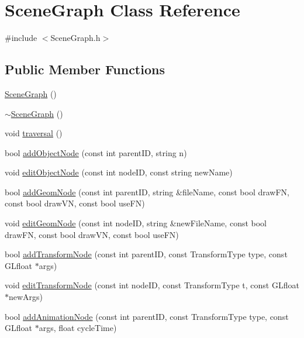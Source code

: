 \hypertarget{classSceneGraph}{\section{Scene\-Graph Class Reference}
\label{classSceneGraph}
}


{\ttfamily \#include $<$Scene\-Graph.\-h$>$}

\subsection*{Public Member Functions}
\begin{DoxyCompactItemize}
\item 
\hyperlink{classSceneGraph_a10cb00465716a38ceff196f9ee220620}{Scene\-Graph} ()
\item 
\hyperlink{classSceneGraph_a4f7164675d0787d1ab73dea9da097db7}{$\sim$\-Scene\-Graph} ()
\item 
void \hyperlink{classSceneGraph_aec1ab0dea305ce38e77fdf0c2eff663a}{traversal} ()
\item 
bool \hyperlink{classSceneGraph_a6b81c95f19b42385e5f0c97212884bb7}{add\-Object\-Node} (const int parent\-I\-D, string n)
\item 
void \hyperlink{classSceneGraph_aa700695f92cfc45d639f12013c5d8041}{edit\-Object\-Node} (const int node\-I\-D, const string new\-Name)
\item 
bool \hyperlink{classSceneGraph_a485de4aab6468a0b744c90e6300b4560}{add\-Geom\-Node} (const int parent\-I\-D, string \&file\-Name, const bool draw\-F\-N, const bool draw\-V\-N, const bool use\-F\-N)
\item 
void \hyperlink{classSceneGraph_a4d3d9842a52c7d08a7ec8167e7b63f22}{edit\-Geom\-Node} (const int node\-I\-D, string \&new\-File\-Name, const bool draw\-F\-N, const bool draw\-V\-N, const bool use\-F\-N)
\item 
bool \hyperlink{classSceneGraph_aa08d1e21cd6eb46623aedf5365515476}{add\-Transform\-Node} (const int parent\-I\-D, const Transform\-Type type, const G\-Lfloat $\ast$args)
\item 
void \hyperlink{classSceneGraph_a0ee6318b0f71b81fc70587038aa06fcd}{edit\-Transform\-Node} (const int node\-I\-D, const Transform\-Type t, const G\-Lfloat $\ast$new\-Args)
\item 
bool \hyperlink{classSceneGraph_a50057912223b1fde361a661846efc30a}{add\-Animation\-Node} (const int parent\-I\-D, const Transform\-Type type, const G\-Lfloat $\ast$args, float cycle\-Time)
\item 

\end{DoxyCompactItemize}
